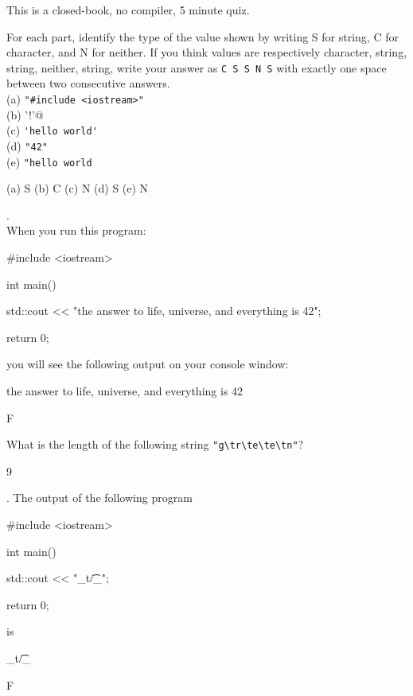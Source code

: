 

This is a closed-book, no compiler, 5 minute quiz.

\nextq
For each part, identify the type of the value shown
by writing S for string, C for character, and N for neither.
If you think values are respectively character, string, string, neither,
string, write your answer as \verb!C S S N S! with exactly one
space between two consecutive answers.
\\
(a) \verb!"#include <iostream>"!
\\
(b) \verb@'!'@
\\
(c) \verb!'hello world'!
\\
(d) \verb!"42"!
\\
(e) \verb!"hello world!
\\
\ANSWER
\begin{answercode}
(a) S
(b) C
(c) N
(d) S
(e) N
\end{answercode}

\nextq \tf.
\\
When you run this program:
\begin{console}[fontsize=\small]
#include <iostream>

int main()
{
    std::cout << "the answer to life, universe, and everything is 42\n";

    return 0;
}
\end{console}
you will see the following output on your console window:
\begin{console}[fontsize=\small]
the answer to life, universe, and everything is 42\n
\end{console}
\ANSWER
\begin{answercode}
F
\end{answercode}

\nextq
What is the length of the following string \verb!"g\tr\te\te\tn"!?

\ANSWER
\begin{answercode}
9
\end{answercode}

\nextq \tf.
The output of the following program
\begin{console}[fontsize=\small]
#include <iostream>

int main()
{
    std::cout << "_t/\t_\n";

    return 0;
}
\end{console}
is
\begin{console}[fontsize=\small]
_t/\t_
\end{console}
\ANSWER
\begin{answercode}
F
\end{answercode}

